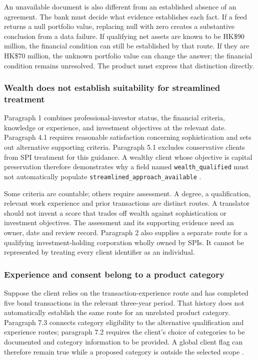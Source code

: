 \documentclass[12pt,a4paper,oneside,openany]{book}
\newcommand{\caseheading}[1]{\subsubsection*{#1}}
\begin{document}
An unavailable document is also different from an established absence of an
agreement. The bank must decide what evidence establishes each fact. If a feed
returns a null portfolio value, replacing null with zero creates a substantive
conclusion from a data failure. If qualifying net assets are known to be
HK\$90 million, the financial condition can still be established by that route.
If they are HK\$70 million, the unknown portfolio value can change the answer;
the financial condition remains unresolved. The product must express that
distinction directly.

\caseheading{Wealth does not establish suitability for streamlined treatment}
Paragraph 1 combines professional-investor status, the financial criteria,
knowledge or experience, and investment objectives at the relevant date.
Paragraph 4.1 requires reasonable satisfaction concerning sophistication and
sets out alternative supporting criteria. Paragraph 5.1 excludes conservative
clients from SPI treatment for this guidance. A wealthy client whose objective
is capital preservation therefore demonstrates why a field named
\texttt{wealth\_qualified} must not automatically populate
\texttt{streamlined\_approach\_available}
\citep[Annex 1, paras.~1, 4--5]{sfcspiannex1}.

Some criteria are countable; others require assessment. A degree, a qualification,
relevant work experience and prior transactions are distinct routes. A translator
should not invent a score that trades off wealth against sophistication or
investment objectives. The assessment and its supporting evidence need an owner,
date and review record. Paragraph 2 also supplies a separate route for a qualifying
investment-holding corporation wholly owned by SPIs. It cannot be represented by
treating every client identifier as an individual.

\caseheading{Experience and consent belong to a product category}
Suppose the client relies on the transaction-experience route and has completed
five bond transactions in the relevant three-year period. That history does not
automatically establish the same route for an unrelated product category.
Paragraph 7.3 connects category eligibility to the alternative qualification and
experience routes; paragraph 7.2 requires the client's choice of categories to be
documented and category information to be provided. A global client flag can
therefore remain true while a proposed category is outside the selected scope
\citep[Annex 1, paras.~4.1, 7.1--7.3]{sfcspiannex1}.
\end{document}
